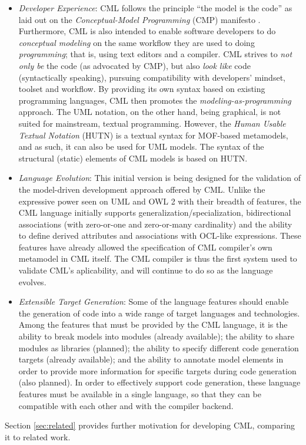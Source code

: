 \begin{itemize}

\item \emph{Developer Experience}:
CML follows the principle ``the model is the code'' as laid out on the \emph{Conceptual-Model Programming} (CMP) manifesto \cite{cmp}.
Furthermore,
CML is also intended to enable software developers to do \emph{conceptual modeling}
on the same workflow they are used to doing \emph{programming};
that is, using text editors and a compiler.
CML strives to \emph{not only be} the code (as advocated by CMP),
but also \emph{look like} code (syntactically speaking),
pursuing compatibility with developers' mindset, toolset and workflow.
By providing its own syntax based on existing programming languages,
CML then promotes the \emph{modeling-as-programming} approach.
The UML \cite{uml} notation, on the other hand,
being graphical,
is not suited for mainstream, textual programming.
However, the \emph{Human Usable Textual Notation} (HUTN) \cite{hutn} is a textual syntax for MOF-based \cite{mof} metamodels,
and as such, it can also be used for UML models.
The syntax of the structural (static) elements of CML models is based on HUTN.

\item \emph{Language Evolution}:
This initial version is being designed for the validation of the model-driven development approach offered by CML.
Unlike the expressive power seen on UML \cite{uml} and OWL 2 \cite{owl2} with their breadth of features,
the CML language initially supports generalization/specialization,
bidirectional associations (with zero-or-one and zero-or-many cardinality)
and the ability to define derived attributes and associations with OCL-like expressions.
These features have already allowed the specification of CML compiler's own metamodel in CML itself.
The CML compiler is thus the first system used to validate CML's aplicability,
and will continue to do so as the language evolves.

\item \emph{Extensible Target Generation}:
Some of the language features should enable the generation of code
into a wide range of target languages and technologies.
Among the features that must be provided by the CML language,
it is the ability to break models into modules (already available);
the ability to share modules as libraries (planned);
the ability to specify different code generation targets (already available);
and the ability to annotate model elements in order to provide more information
for specific targets during code generation (also planned).
In order to effectively support code generation,
these language features must be available in a single language,
so that they can be compatible with each other and with the compiler backend.

\end{itemize}

Section \ref{sec:related} provides further motivation for developing CML,
comparing it to related work.
